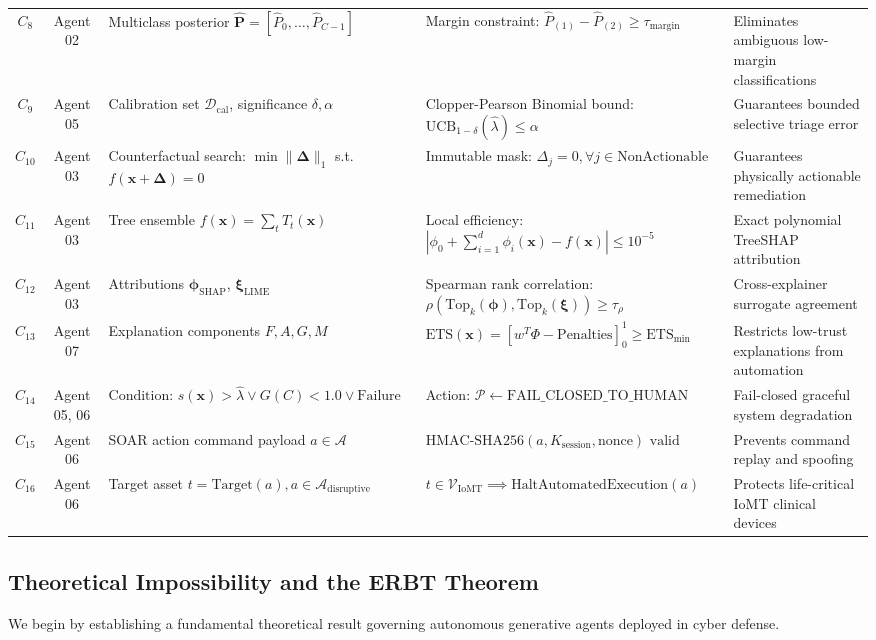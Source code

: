 \documentclass{ieeeaccess}
\begin{document}
\begin{table}[t]
\begin{tabular}{cclll}
$C_8$ & Agent 02 & Multiclass posterior $\hat{\mathbf{P}} = [\hat{P}_0, \dots, \hat{P}_{C-1}]$ & Margin constraint: $\hat{P}_{(1)} - \hat{P}_{(2)} \ge \tau_{\text{margin}}$ & Eliminates ambiguous low-margin classifications \\
$C_9$ & Agent 05 & Calibration set $\mathcal{D}_{\text{cal}}$, significance $\delta, \alpha$ & Clopper-Pearson Binomial bound: $\text{UCB}_{1-\delta}(\hat{\lambda}) \le \alpha$ & Guarantees bounded selective triage error \\
$C_{10}$ & Agent 03 & Counterfactual search: $\min \|\boldsymbol{\Delta}\|_1$ s.t. $f(\mathbf{x}+\boldsymbol{\Delta})=0$ & Immutable mask: $\Delta_j = 0, \forall j \in \text{NonActionable}$ & Guarantees physically actionable remediation \\
$C_{11}$ & Agent 03 & Tree ensemble $f(\mathbf{x}) = \sum_{t} T_t(\mathbf{x})$ & Local efficiency: $|\phi_0 + \sum_{i=1}^d \phi_i(\mathbf{x}) - f(\mathbf{x})| \le 10^{-5}$ & Exact polynomial TreeSHAP attribution \\
$C_{12}$ & Agent 03 & Attributions $\boldsymbol{\phi}_{\text{SHAP}}$, $\boldsymbol{\xi}_{\text{LIME}}$ & Spearman rank correlation: $\rho(\text{Top}_k(\boldsymbol{\phi}), \text{Top}_k(\boldsymbol{\xi})) \ge \tau_{\rho}$ & Cross-explainer surrogate agreement \\
$C_{13}$ & Agent 07 & Explanation components $F, A, G, M$ & $\text{ETS}(\mathbf{x}) = [w^T \Phi - \text{Penalties}]_0^1 \ge \text{ETS}_{\min}$ & Restricts low-trust explanations from automation \\
$C_{14}$ & Agent 05, 06 & $\text{Condition: } s(\mathbf{x}) > \hat{\lambda} \vee G(C) < 1.0 \vee \text{Failure}$ & Action: $\mathcal{P} \leftarrow \text{FAIL\_CLOSED\_TO\_HUMAN}$ & Fail-closed graceful system degradation \\
$C_{15}$ & Agent 06 & SOAR action command payload $a \in \mathcal{A}$ & $\text{HMAC-SHA256}(a, K_{\text{session}}, \text{nonce}) \text{ valid}$ & Prevents command replay and spoofing \\
$C_{16}$ & Agent 06 & Target asset $t = \text{Target}(a), a \in \mathcal{A}_{\text{disruptive}}$ & $t \in \mathcal{V}_{\text{IoMT}} \implies \text{HaltAutomatedExecution}(a)$ & Protects life-critical IoMT clinical devices \\
\bottomrule
\end{tabular}
\end{table}

\subsection{Theoretical Impossibility and the ERBT Theorem}
We begin by establishing a fundamental theoretical result governing autonomous generative agents deployed in cyber defense.
\end{document}
